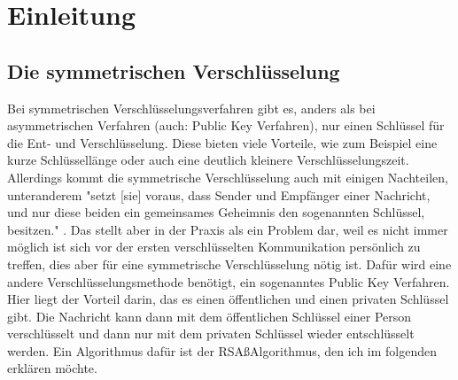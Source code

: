 \documentclass[12pt,a4paper]{scrartcl}
\begin{document}
	
\thispagestyle{empty}
\tableofcontents
\thispagestyle{empty}


\pagebreak
\section{Einleitung}

\subsection{Die symmetrischen Verschlüsselung}

Bei symmetrischen Verschlüsselungsverfahren gibt es, anders als bei asymmetrischen Verfahren (auch: Public Key Verfahren), nur einen Schlüssel für die Ent- und Verschlüsselung. Diese bieten viele Vorteile, wie zum Beispiel eine kurze Schlüssellänge oder auch eine deutlich kleinere Verschlüsselungszeit. Allerdings kommt die symmetrische Verschlüsselung auch mit einigen Nachteilen, unteranderem "setzt [sie] voraus, dass Sender und Empfänger einer Nachricht, und nur diese beiden ein gemeinsames
Geheimnis den sogenannten Schlüssel, besitzen." \cite[S. 7]{schwenk2010sicherheit}. Das stellt aber in der Praxis als ein Problem dar, weil es nicht immer möglich ist sich vor der ersten verschlüsselten Kommunikation persönlich zu treffen, dies aber für eine symmetrische Verschlüsselung nötig ist. Dafür wird eine andere Verschlüsselungsmethode benötigt, ein sogenanntes Public Key Verfahren. Hier liegt der Vorteil darin, das es einen öffentlichen und einen privaten Schlüssel gibt. Die Nachricht kann dann mit dem öffentlichen Schlüssel einer Person verschlüsselt und dann nur mit dem privaten Schlüssel wieder entschlüsselt werden. Ein Algorithmus dafür ist der RSAßAlgorithmus, den ich im folgenden erklären möchte.
\end{document}
